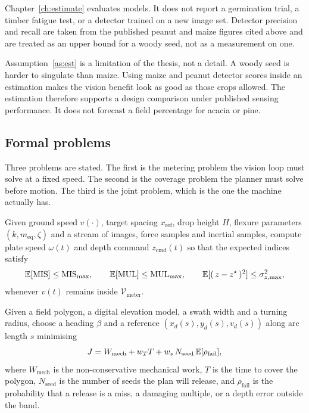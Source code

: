 \begin{assumption}
\label{as:est}
Chapter~\ref{ch:estimate} evaluates models. It does not report a germination trial, a timber fatigue test, or a detector trained on a new image set. Detector precision and recall are taken from the published peanut and maize figures cited above and are treated as an upper bound for a woody seed, not as a measurement on one.
\end{assumption}

Assumption~\ref{as:est} is a limitation of the thesis, not a detail. A woody seed is harder to singulate than maize. Using maize and peanut detector scores inside an estimation makes the vision benefit look as good as those crops allowed. The estimation therefore supports a design comparison under published sensing performance. It does not forecast a field percentage for acacia or pine.

\subsection{Formal problems}

Three problems are stated. The first is the metering problem the vision loop must solve at a fixed speed. The second is the coverage problem the planner must solve before motion. The third is the joint problem, which is the one the machine actually has.

\begin{definition}
\label{def:p1}
Given ground speed \(v(\cdot)\), target spacing \(x_{\mathrm{ref}}\), drop height \(H\), flexure parameters \((k,m_{\mathrm{eq}},\zeta)\) and a stream of images, force samples and inertial samples, compute plate speed \(\omega(t)\) and depth command \(z_{\mathrm{cmd}}(t)\) so that the expected indices satisfy
\begin{equation}
\label{eq:p1}
\mathbb{E}[\mathrm{MIS}] \le \mathrm{MIS}_{\max},\qquad
\mathbb{E}[\mathrm{MUL}] \le \mathrm{MUL}_{\max},\qquad
\mathbb{E}[(\,z - z^{\star}\,)^2] \le \sigma_{z,\max}^2,
\end{equation}
whenever \(v(t)\) remains inside \(\mathcal{V}_{\mathrm{meter}}\).
\end{definition}

\begin{definition}
\label{def:p2}
Given a field polygon, a digital elevation model, a swath width and a turning radius, choose a heading \(\beta\) and a reference \((x_d(s),y_d(s),v_d(s))\) along arc length \(s\) minimising
\begin{equation}
\label{eq:p2}
J = W_{\mathrm{mech}} + w_T T + w_s\, N_{\mathrm{seed}}\, \mathbb{E}[\rho_{\mathrm{fail}}],
\end{equation}
where \(W_{\mathrm{mech}}\) is the non-conservative mechanical work, \(T\) is the time to cover the polygon, \(N_{\mathrm{seed}}\) is the number of seeds the plan will release, and \(\rho_{\mathrm{fail}}\) is the probability that a release is a miss, a damaging multiple, or a depth error outside the band.
\end{definition}

